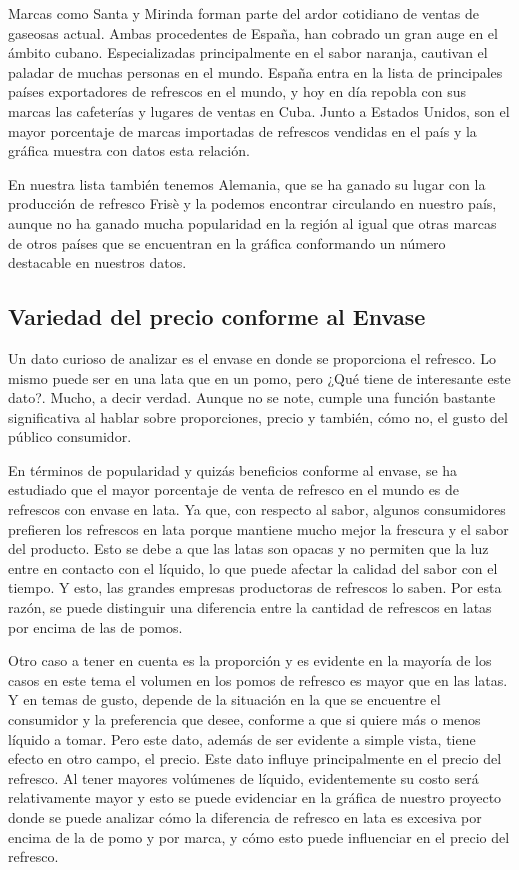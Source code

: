 \documentclass[a4paper,12pt]{article}
\begin{document}
Marcas como Santa y Mirinda forman parte del ardor cotidiano de ventas de gaseosas actual. 
Ambas procedentes de España, han cobrado un gran auge en el ámbito cubano. Especializadas principalmente en el sabor naranja, cautivan el paladar de muchas personas en el mundo. 
España entra en la lista de principales países exportadores de refrescos en el mundo, y hoy en día repobla con sus marcas las cafeterías y lugares de ventas en Cuba. 
Junto a Estados Unidos, son el mayor porcentaje de marcas importadas de refrescos vendidas en el país y la gráfica muestra con datos esta relación.

En nuestra lista también tenemos Alemania, que se ha ganado su lugar con la producción de refresco Frisè y la podemos encontrar circulando en nuestro país, aunque no ha ganado mucha popularidad en la región al igual que otras marcas de otros países que se encuentran en la gráfica conformando un número destacable en nuestros datos.

\subsection{Variedad del precio conforme al Envase}
Un dato curioso de analizar es el envase en donde se proporciona el refresco. 
Lo mismo puede ser en una lata que en un pomo, pero ¿Qué tiene de interesante este dato?. 
Mucho, a decir verdad. Aunque no se note, cumple una función bastante significativa al hablar sobre proporciones, precio y también, cómo no, el gusto del público consumidor.

En términos de popularidad y quizás beneficios conforme al envase, se ha estudiado que el mayor porcentaje de venta de refresco en el mundo es de refrescos con envase en lata. 
Ya que, con respecto al sabor, algunos consumidores prefieren los refrescos en lata porque mantiene mucho mejor la frescura y el sabor del producto. 
Esto se debe a que las latas son opacas y no permiten que la luz entre en contacto con el líquido, lo que puede afectar la calidad del sabor con el tiempo. 
Y esto, las grandes empresas productoras de refrescos lo saben. Por esta razón, se puede distinguir una diferencia entre la cantidad de refrescos en latas por encima de las de pomos.

Otro caso a tener en cuenta es la proporción y es evidente en la mayoría de los casos en este tema el volumen en los pomos de refresco es mayor que en las latas. 
Y en temas de gusto, depende de la situación en la que se encuentre el consumidor y la preferencia que desee, conforme a que si quiere más o menos líquido a tomar. 
Pero este dato, además de ser evidente a simple vista, tiene efecto en otro campo, el precio. Este dato influye principalmente en el precio del refresco. 
Al tener mayores volúmenes de líquido, evidentemente su costo será relativamente mayor y esto se puede evidenciar en la gráfica de nuestro proyecto donde se puede analizar cómo la diferencia de refresco en lata es excesiva por encima de la de pomo y por marca, y cómo esto puede influenciar en el precio del refresco.
\end{document}
